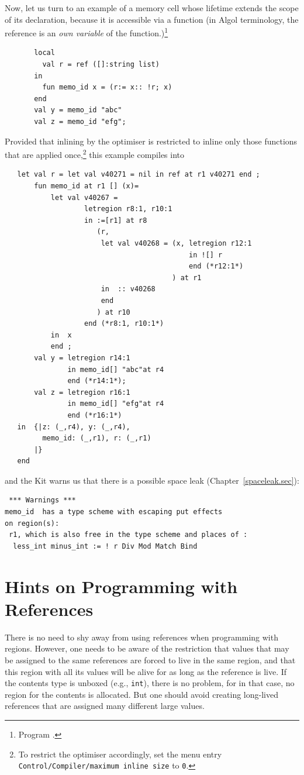 \documentclass[12pt]{book}
\begin{document}
Now, let us turn to an example of a memory cell whose lifetime
extends the scope of its declaration, because it is
accessible via a function (in Algol terminology,
the reference is an {\em own variable} of the function.)\footnote{Program .}
\begin{verbatim}
       local
         val r = ref ([]:string list)
       in
         fun memo_id x = (r:= x:: !r; x)
       end
       val y = memo_id "abc"
       val z = memo_id "efg";
\end{verbatim}
Provided that inlining by the optimiser is restricted to inline only
those functions that are applied once,\footnote{To restrict the
  optimiser accordingly, set the menu entry {\tt Control/Compiler/maximum
    inline size} to {\tt 0}.} this example compiles into
\begin{verbatim}
   let val r = let val v40271 = nil in ref at r1 v40271 end ; 
       fun memo_id at r1 [] (x)= 
           let val v40267 = 
                   letregion r8:1, r10:1 
                   in :=[r1] at r8 
                      (r, 
                       let val v40268 = (x, letregion r12:1 
                                            in ![] r 
                                            end (*r12:1*)
                                        ) at r1
                       in  :: v40268
                       end 
                      ) at r10 
                   end (*r8:1, r10:1*)
           in  x
           end ; 
       val y = letregion r14:1 
               in memo_id[] "abc"at r4 
               end (*r14:1*); 
       val z = letregion r16:1 
               in memo_id[] "efg"at r4 
               end (*r16:1*)
   in  {|z: (_,r4), y: (_,r4), 
         memo_id: (_,r1), r: (_,r1)
       |}
   end 
\end{verbatim}
and the Kit warns us that there is a possible space leak (Chapter~\ref{spaceleak.sec}):
\begin{verbatim}
 *** Warnings ***
memo_id  has a type scheme with escaping put effects 
on region(s): 
 r1, which is also free in the type scheme and places of :  
  less_int minus_int := ! r Div Mod Match Bind
\end{verbatim}

\section{Hints on Programming  with References}
There is no need to shy away from using references when programming
with regions. However, one needs to be aware of the restriction that
values that may be assigned to the same references are forced to live
in the same region, and that this region with all its values will be alive
for as long as the reference is live. If the
contents type is unboxed (e.g., {\tt int}), there is no problem,
for in that case, no region
for the contents is allocated. But one should avoid creating
long-lived references that are assigned many different large values.
\end{document}
